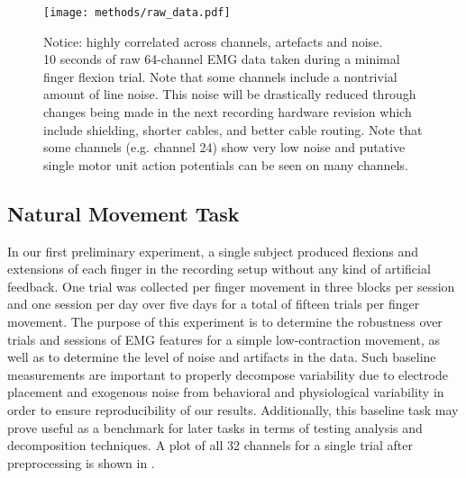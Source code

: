 \documentclass[../main.tex]{subfiles}
\begin{document}
\begin{figure}
  \centering
  \texttt{[image: methods/raw\_data.pdf]}
  \caption[Example raw EMG data]{Notice: highly correlated across channels, artefacts and noise. \\ 10 seconds of raw 64-channel EMG data taken during a minimal finger flexion trial. Note that some channels include a nontrivial amount of line noise. This noise will be drastically reduced through changes being made in the next recording hardware revision which include shielding, shorter cables, and better cable routing. Note that some channels (e.g. channel 24) show very low noise and putative single motor unit action potentials can be seen on many channels.}\label{fig:raw_data}
\end{figure}


\subsection{Natural Movement Task}

In our first preliminary experiment, a single subject produced flexions and extensions of each finger in the recording setup without any kind of artificial feedback. One trial was collected per finger movement in three blocks per session and one session per day over five days for a total of fifteen trials per finger movement. The purpose of this experiment is to determine the robustness over trials and sessions of EMG features for a simple low-contraction movement, as well as to determine the level of noise and artifacts in the data. Such baseline measurements are important to properly decompose variability due to electrode placement and exogenous noise from behavioral and physiological variability in order to ensure reproducibility of our results. Additionally, this baseline task may prove useful as a benchmark for later tasks in terms of testing analysis and decomposition techniques. A plot of all 32 channels for a single trial after preprocessing is shown in .

\end{document}
